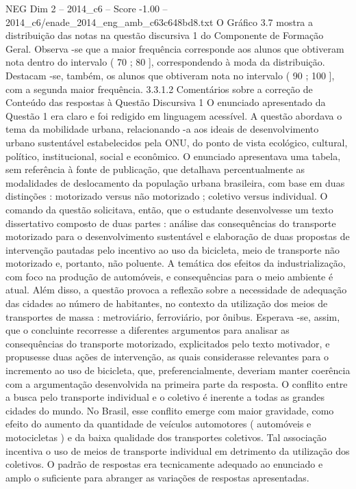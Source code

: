 \begin{textsample}{NEG Dim 2 – 2014\_c6 – Score -1.00 – 2014\_c6/enade\_2014\_eng\_amb\_c63c648bd8.txt}
O Gráfico 3.7 mostra a distribuição das notas na questão discursiva 1 do Componente de Formação Geral.
Observa -se que a maior frequência corresponde aos alunos que obtiveram nota dentro do intervalo ( 70 ; 80 ], correspondendo à moda da distribuição.
Destacam -se, também, os alunos que obtiveram nota no intervalo ( 90 ; 100 ], com a segunda maior frequência. 3.3.1.2 Comentários sobre a correção de Conteúdo das respostas à Questão Discursiva 1 O enunciado apresentado da Questão 1 era claro e foi redigido em linguagem acessível.
A questão abordava o tema da mobilidade urbana, relacionando -a aos ideais de desenvolvimento urbano sustentável estabelecidos pela ONU, do ponto de vista ecológico, cultural, político, institucional, social e econômico.
O enunciado apresentava uma tabela, sem referência à fonte de publicação, que detalhava percentualmente as modalidades de deslocamento da população urbana brasileira, com base em duas distinções : motorizado versus não motorizado ; coletivo versus individual.
O comando da questão solicitava, então, que o estudante desenvolvesse um texto dissertativo composto de duas partes : análise das consequências do transporte motorizado para o desenvolvimento sustentável e elaboração de duas propostas de intervenção pautadas pelo incentivo ao uso da bicicleta, meio de transporte não motorizado e, portanto, não poluente.
A temática dos efeitos da industrialização, com foco na produção de automóveis, e consequências para o meio ambiente é atual.
Além disso, a questão provoca a reflexão sobre a necessidade de adequação das cidades ao número de habitantes, no contexto da utilização dos meios de transportes de massa : metroviário, ferroviário, por ônibus.
Esperava -se, assim, que o concluinte recorresse a diferentes argumentos para analisar as consequências do transporte motorizado, explicitados pelo texto motivador, e propusesse duas ações de intervenção, as quais considerasse relevantes para o incremento ao uso de bicicleta, que, preferencialmente, deveriam manter coerência com a argumentação desenvolvida na primeira parte da resposta.
O conflito entre a busca pelo transporte individual e o coletivo é inerente a todas as grandes cidades do mundo.
No Brasil, esse conflito emerge com maior gravidade, como efeito do aumento da quantidade de veículos automotores ( automóveis e motocicletas ) e da baixa qualidade dos transportes coletivos.
Tal associação incentiva o uso de meios de transporte individual em detrimento da utilização dos coletivos.
O padrão de respostas era tecnicamente adequado ao enunciado e amplo o suficiente para abranger as variações de respostas apresentadas.

\end{textsample}
